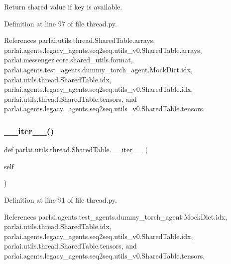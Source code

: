 \begin{DoxyVerb}Return shared value if key is available.\end{DoxyVerb}
 

Definition at line 97 of file thread.\+py.



References parlai.\+utils.\+thread.\+Shared\+Table.\+arrays, parlai.\+agents.\+legacy\+\_\+agents.\+seq2seq.\+utils\+\_\+v0.\+Shared\+Table.\+arrays, parlai.\+messenger.\+core.\+shared\+\_\+utils.\+format, parlai.\+agents.\+test\+\_\+agents.\+dummy\+\_\+torch\+\_\+agent.\+Mock\+Dict.\+idx, parlai.\+utils.\+thread.\+Shared\+Table.\+idx, parlai.\+agents.\+legacy\+\_\+agents.\+seq2seq.\+utils\+\_\+v0.\+Shared\+Table.\+idx, parlai.\+utils.\+thread.\+Shared\+Table.\+tensors, and parlai.\+agents.\+legacy\+\_\+agents.\+seq2seq.\+utils\+\_\+v0.\+Shared\+Table.\+tensors.

\mbox{\label{classparlai_1_1utils_1_1thread_1_1SharedTable_a6c386b5fba3bd7ff0715c808decbaa54}} 
\subsubsection{\texorpdfstring{\+\_\+\+\_\+iter\+\_\+\+\_\+()}{\_\_iter\_\_()}}
{\footnotesize\ttfamily def parlai.\+utils.\+thread.\+Shared\+Table.\+\_\+\+\_\+iter\+\_\+\+\_\+ (\begin{DoxyParamCaption}\item[{}]{self }\end{DoxyParamCaption})}



Definition at line 91 of file thread.\+py.



References parlai.\+agents.\+test\+\_\+agents.\+dummy\+\_\+torch\+\_\+agent.\+Mock\+Dict.\+idx, parlai.\+utils.\+thread.\+Shared\+Table.\+idx, parlai.\+agents.\+legacy\+\_\+agents.\+seq2seq.\+utils\+\_\+v0.\+Shared\+Table.\+idx, parlai.\+utils.\+thread.\+Shared\+Table.\+tensors, and parlai.\+agents.\+legacy\+\_\+agents.\+seq2seq.\+utils\+\_\+v0.\+Shared\+Table.\+tensors.

\mbox{\label{classparlai_1_1utils_1_1thread_1_1SharedTable_a6b6c4f7fb5887de4e2c82b0c11b6d680}} 
